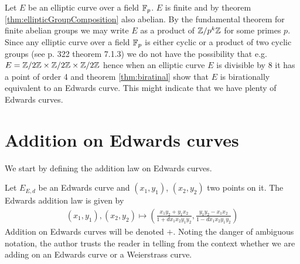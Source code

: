 Let $E$ be an elliptic curve over a field $\mathbb{F}_p$. $E$ is finite and by theorem \ref{thm:ellipticGroupComposition} also abelian. By the fundamental theorem for finite abelian groups we may write $E$ as a product of $\mathbb{Z}/p^k\mathbb{Z}$ for some primes $p$. Since any elliptic curve over a field $\mathbb{F}_p$ is either cyclic or a product of two cyclic groups (see \cite{pomeranceEt.al} p. 322 theorem 7.1.3) we do not have the possibility that e.g. $E=\mathbb{Z}/2\mathbb{Z}\times\mathbb{Z}/2\mathbb{Z}\times\mathbb{Z}/2\mathbb{Z}$ hence when an elliptic curve $E$ is divisible by 8 it has a point of order 4 and theorem \ref{thm:biratinal} show that $E$ is birationally equivalent to an Edwards curve. This might indicate that we have plenty of Edwards curves. 

\section{Addition on Edwards curves}\label{sec:addEdward}
We start by defining the addition law on Edwards curves.
\begin{defn}\label{def:EdwardsAddition}
Let $E_{E,d}$ be an Edwards curve and $(x_1,y_1)$, $(x_2,y_2)$ two points on it. The Edwards addition law is given by
\begin{align}\label{rel:additionsLawEdward}
	(x_1,y_1),(x_2,y_2)\mapsto \left(\frac{x_1y_2+y_1x_2}{1+dx_1x_2y_1y_2},\frac{y_1y_2-x_1x_2}{1-dx_1x_2y_1y_2}\right)
\end{align}
Addition on Edwards curves will be denoted $+$. Noting the danger of ambiguous notation, the author trusts the reader in telling from the context whether we are adding on an Edwards curve or a Weierstrass curve. 
\end{defn}

